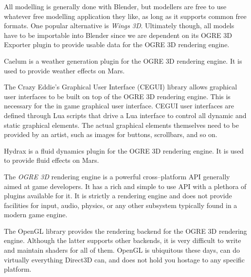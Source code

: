 

\startitemize[4]

All modelling is generally done with Blender, but modellers are free to use whatever free modelling application they like, as long as it supports common free formats. One popular alternative is {\it Wings 3D}. Ultimately though, all models have to be importable into Blender since we are dependent on its OGRE 3D Exporter plugin to provide usable data for the OGRE 3D rendering engine.


Caelum is a weather generation plugin for the OGRE 3D rendering engine. It is used to provide weather effects on Mars.


The Crazy Eddie's Graphical User Interface (CEGUI) library allows graphical user interfaces to be built on top of the OGRE 3D rendering engine. This is necessary for the in game graphical user interface. CEGUI user interfaces are defined through Lua scripts that drive a Lua interface to control all dynamic and static graphical elements. The actual graphical elements themselves need to be provided by an artist, such as images for buttons, scrollbars, and so on.


Hydrax is a fluid dynamics plugin for the OGRE 3D rendering engine. It is used to provide fluid effects on Mars.


The {\it OGRE 3D} rendering engine is a powerful cross--platform API generally aimed at game developers. It has a rich and simple to use API with a plethora of plugins available for it. It is strictly a rendering engine and does not provide facilities for input, audio, physics, or any other subsystem typically found in a modern game engine.


The OpenGL library provides the rendering backend for the OGRE 3D rendering engine. Although the latter supports other backends, it is very difficult to write and maintain shaders for all of them. OpenGL is ubiquitous these days, can do virtually everything Direct3D can, and does not hold you hostage to any specific platform.

